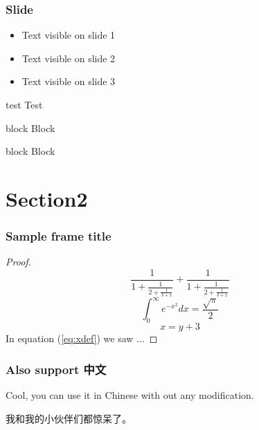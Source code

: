 \documentclass[aspectratio=169]{beamer}
\begin{document}
    \begin{frame}
        \frametitle{Slide}
        \begin{itemize}
            \setlength{\itemindent}{0em}
            \item{Text visible on slide 1}
            \item Text visible on slide 2
            \item Text visible on slide 3
        \end{itemize}
        \begin{exampleblock}{test}
            Test
        \end{exampleblock}
        \begin{block}{block}
            Block
        \end{block}
        \begin{alertblock}{block}
            Block
        \end{alertblock}
    \end{frame}
    \section{Section2}
    \begin{frame}
        \frametitle{Sample frame title}
        \begin{proof}
            $$
            \frac{1}{\displaystyle 1+
            \frac{1}{\displaystyle 2+
            \frac{1}{\displaystyle 3+x}}} +
            \frac{1}{1+\frac{1}{2+\frac{1}{3+x}}}
            $$
            $$\int_0^\infty e^{-x^2} dx=\frac{\sqrt{\pi}}{2}$$
            \begin{equation}
                x=y+3 \label{eq:xdef}
            \end{equation}
            In equation (\ref{eq:xdef}) we saw $\dots$
        \end{proof}

    \end{frame}
    \begin{frame}
        \frametitle{Also support 中文}
        Cool, you can use it in Chinese with out any modification.\par
        我和我的小伙伴们都惊呆了。
    \end{frame}
    \appendix
    \setcounter{finalframe}{\value{framenumber}}

    \begin{frame} %
    \end{frame}
\end{document}
